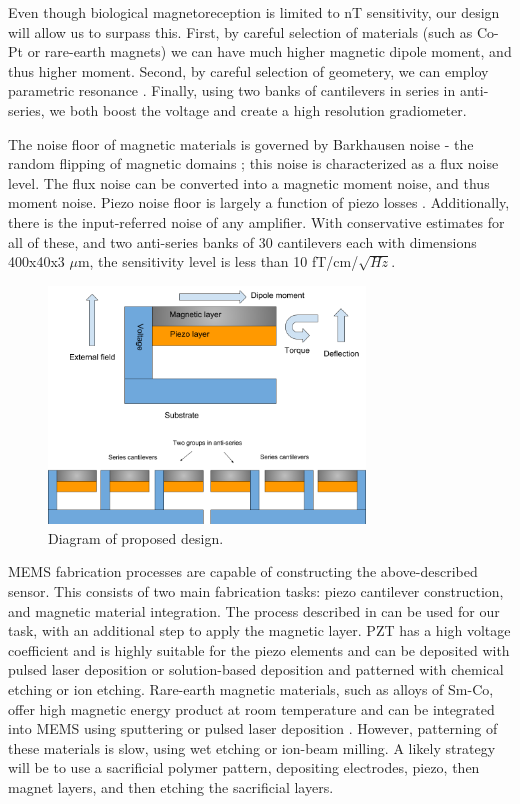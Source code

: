  Even though biological magnetoreception is limited to nT sensitivity, our design will allow us to surpass this. First, by careful selection of materials (such as Co-Pt or rare-earth magnets) \cite{coey2010magnetism, arnold2009permanent} we can have much higher magnetic dipole moment, and thus higher moment. Second, by careful selection of geometery, we can employ parametric resonance \cite{van2006resonant}. Finally, using two banks of cantilevers in series in anti-series, we both boost the voltage and create a high resolution gradiometer.

 The noise floor of magnetic materials is governed by Barkhausen noise - the random flipping of magnetic domains \cite{butta2012sources}; this noise is characterized as a flux noise level. The flux noise can be converted into a magnetic moment noise, and thus moment noise. Piezo noise floor is largely a function of piezo losses \cite{levinzon2004fundamental}. Additionally, there is the input-referred noise of any amplifier. With conservative estimates for all of these, and two anti-series banks of 30 cantilevers each with dimensions 400x40x3 $\mu$m, the sensitivity level is less than 10 fT/cm/$\sqrt{Hz}$.

\begin{figure}
\centering
\includegraphics[width=0.75\textwidth]{biomag}
\caption{Diagram of proposed design.}
\label{fig:diagram}
\end{figure}

MEMS fabrication processes are capable of constructing the above-described sensor. This consists of two main fabrication tasks: piezo cantilever construction, and magnetic material integration. The process described in \cite{shen2008design} can be used for our task, with an additional step to apply the magnetic layer. PZT has a high voltage coefficient and is highly suitable for the piezo elements \cite{tadigadapa2009piezoelectric} and can be deposited with pulsed laser deposition or solution-based deposition and patterned with chemical etching or ion etching. Rare-earth magnetic materials, such as alloys of Sm-Co, offer high magnetic energy product at room temperature and can be integrated into MEMS using sputtering or pulsed laser deposition \cite{arnold2009permanent}. However, patterning of these materials is slow, using wet etching or ion-beam milling. A likely strategy will be to use a sacrificial polymer pattern, depositing electrodes, piezo, then magnet layers, and then etching the sacrificial layers. 

